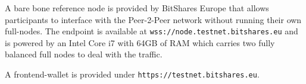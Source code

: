 A bare bone reference node is provided by BitShares Europe that allows
participants to interface with the Peer-2-Peer network without running their
own full-nodes. The endpoint is available at
\texttt{wss://node.testnet.bitshares.eu} and is powered by an Intel Core i7 with
64GB of RAM which carries two fully balanced full nodes to deal with the
traffic.

A frontend-wallet is provided under \texttt{https://testnet.bitshares.eu}.
